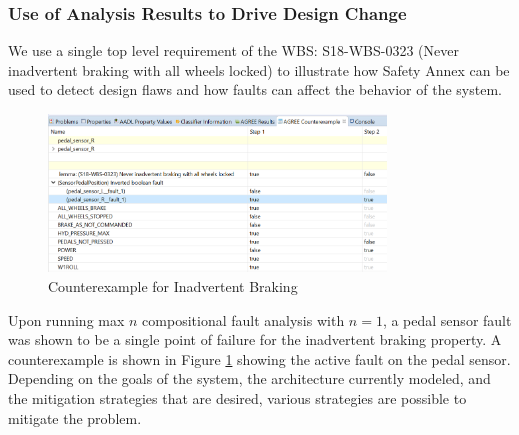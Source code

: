 \subsubsection{Use of Analysis Results to Drive Design Change}
We use a single top level requirement of the WBS: S18-WBS-0323 (Never inadvertent braking with all wheels locked) to illustrate how Safety Annex can be used to detect design flaws and how faults can affect the behavior of the system. 
\begin{figure}[htbp]
	\begin{center}
		\includegraphics[width=0.8\textwidth]{images/counterexample.png}
	\end{center}
	\vspace{-0.3in}
	\caption{Counterexample for Inadvertent Braking}
	\label{fig:counterexample}
\end{figure} 
Upon running max $n$ compositional fault analysis with $n = 1$, a pedal sensor fault was shown to be a single point of failure for the inadvertent braking property. A counterexample is shown in Figure \ref{fig:counterexample} showing the active fault on the pedal sensor. Depending on the goals of the system, the architecture currently modeled, and the mitigation strategies that are desired, various strategies are possible to mitigate the problem.

